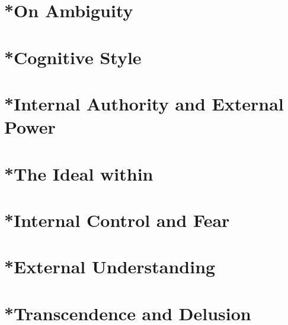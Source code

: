 \section{*On Ambiguity} 
\section{*Cognitive Style}
\section{*Internal Authority and External Power}
\section{*The Ideal within}
\section{*Internal Control and Fear}
\section{*External Understanding}
\section{*Transcendence and Delusion}
